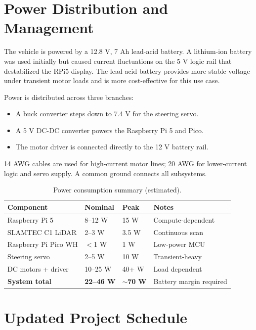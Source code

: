 \documentclass[12pt,a4paper]{report}
\begin{document}
\section{Power Distribution and Management}

The vehicle is powered by a 12.8 V, 7 Ah lead-acid battery. A lithium-ion battery was used initially but caused current fluctuations on the 5 V logic rail that destabilized the RPi5 display. The lead-acid battery provides more stable voltage under transient motor loads and is more cost-effective for this use case.

Power is distributed across three branches:
\begin{itemize}
    \item A buck converter steps down to 7.4 V for the steering servo.
    \item A 5 V DC-DC converter powers the Raspberry Pi 5 and Pico.
    \item The motor driver is connected directly to the 12 V battery rail.
\end{itemize}

14 AWG cables are used for high-current motor lines; 20 AWG for lower-current logic and servo supply. A common ground connects all subsystems.

\begin{table}[H]
\centering
\caption{Power consumption summary (estimated).}
\label{tab:power}
\begin{tabularx}{\textwidth}{|X|p{2.2cm}|p{2cm}|X|}
\hline
\textbf{Component} & \textbf{Nominal} & \textbf{Peak} & \textbf{Notes} \\
\hline
Raspberry Pi 5 & 8--12 W & 15 W & Compute-dependent \\
\hline
SLAMTEC C1 LiDAR & 2--3 W & 3.5 W & Continuous scan \\
\hline
Raspberry Pi Pico WH & $<$1 W & 1 W & Low-power MCU \\
\hline
Steering servo & 2--5 W & 10 W & Transient-heavy \\
\hline
DC motors + driver & 10--25 W & 40+ W & Load dependent \\
\hline
\textbf{System total} & \textbf{22--46 W} & \textbf{$\sim$70 W} & Battery margin required \\
\hline
\end{tabularx}
\end{table}

\section{Updated Project Schedule}
\end{document}

